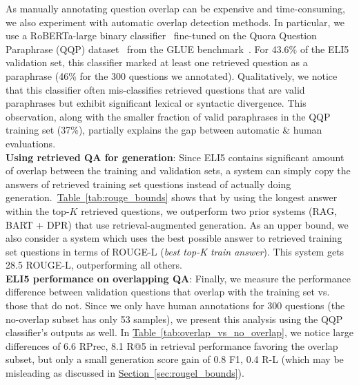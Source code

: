 \documentclass[11pt]{article}
\newcommand{\namedref}[2]{\hyperref[#2]{#1~\ref*{#2}}}
\newcommand{\sectionref}[1]{\namedref{Section}{#1}}
\newcommand{\tableref}[1]{\namedref{Table}{#1}}
\begin{document}
As manually annotating question overlap can be expensive and time-consuming, we also experiment with automatic overlap detection methods. In particular, we use a RoBERTa-large binary classifier~\citep{liu2019roberta} fine-tuned on the Quora Question Paraphrase (QQP) dataset~\citep{iyer2017quora} from the GLUE benchmark~\citep{wang2019glue}. For 43.6\% of the ELI5 validation set, this classifier marked at least one retrieved question as a paraphrase (46\% for the 300 questions we annotated). Qualitatively, we notice that this classifier often mis-classifies retrieved questions that are valid paraphrases but exhibit significant lexical or syntactic divergence. This observation, along with the smaller fraction of valid paraphrases in the QQP training set (37\%), partially explains the gap between automatic \& human evaluations. \\

\noindent \textbf{Using retrieved QA for generation}: Since ELI5 contains significant amount of overlap between the training and validation sets, a system can simply copy the answers of retrieved training set questions instead of actually doing generation.~\tableref{tab:rouge_bounds} shows that by using the longest answer within the top-$K$ retrieved questions,
we outperform two prior systems (RAG, BART + DPR) that use retrieval-augmented generation. As an upper bound, we also consider a system which uses the best possible answer to retrieved training set questions in terms of ROUGE-L (\emph{best top-K train answer}). This system gets 28.5 ROUGE-L, outperforming all others. \\

\noindent \textbf{ELI5 performance on overlapping QA}: Finally, we measure the performance difference between validation questions that overlap with the training set vs. those that do not. Since we only have human annotations for 300 questions (the no-overlap subset has only 53 samples), we present this analysis using the QQP classifier's outputs as well. In \tableref{tab:overlap_vs_no_overlap}, we notice large differences of 6.6 RPrec, 8.1 R@5 in retrieval performance favoring the overlap subset, but only a small generation score gain of 0.8 F1, 0.4 R-L (which may be misleading as discussed in \sectionref{sec:rougel_bounds}).\\
\end{document}
